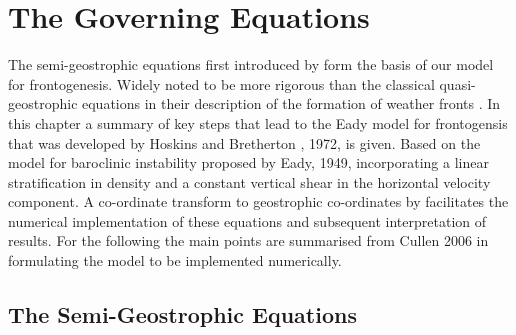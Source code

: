 \chapter{The Governing Equations \label{governingequations}}
The semi-geostrophic equations first introduced by \cite{Eliassen1962}
form the basis of our model for frontogenesis. Widely noted to be more rigorous than the classical quasi-geostrophic equations in their description of the formation of weather fronts 
\cite{Cullen2006a, Hoskins1975}. 
In this chapter a summary of key steps that lead to the Eady model for frontogensis that was developed by Hoskins and Bretherton , 1972, \cite{Hoskins1972} is given. Based on the model for baroclinic instability proposed by Eady, 1949, incorporating a linear stratification in density and a constant vertical shear in the horizontal velocity component. A co-ordinate transform to geostrophic co-ordinates by  \cite{Hoskins1975} 
facilitates the numerical implementation of these equations and subsequent interpretation of results. For the following the main points are summarised from Cullen 2006 \cite{Cullen2006a} in formulating the model to be implemented numerically.
\section{The Semi-Geostrophic Equations \label{SGeqns}} 
